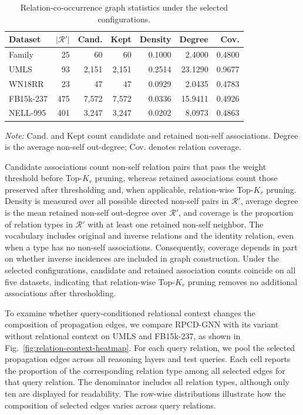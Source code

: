 \documentclass[a4paper,fleqn]{cas-dc}
\newcommand{\papertablestyle}{%
  \footnotesize
  \renewcommand{\arraystretch}{1.12}%
  \setlength{\tabcolsep}{3pt}%
}
\begin{document}
\begin{table}[width=\columnwidth,pos=htbp]
\caption{Relation-co-occurrence graph statistics under the selected configurations.}
\label{tab:relation-context-statistics}
\centering
\papertablestyle
\setlength{\tabcolsep}{1.5pt}
\begin{tabular*}{\linewidth}{@{}l@{\extracolsep{\fill}}rrrrrr@{}}
\toprule
Dataset & $|\mathcal{R}'|$ & Cand. & Kept & Density & Degree & Cov. \\
\midrule
Family & 25 & 60 & 60 & 0.1000 & 2.4000 & 0.4800 \\
UMLS & 93 & 2,151 & 2,151 & 0.2514 & 23.1290 & 0.9677 \\
WN18RR & 23 & 47 & 47 & 0.0929 & 2.0435 & 0.4783 \\
FB15k-237 & 475 & 7,572 & 7,572 & 0.0336 & 15.9411 & 0.4926 \\
NELL-995 & 401 & 3,247 & 3,247 & 0.0202 & 8.0973 & 0.4863 \\
\bottomrule
\end{tabular*}
\par\smallskip
\parbox{\linewidth}{\footnotesize\emph{Note:} Cand. and Kept count candidate and retained non-self associations. Degree is the average non-self out-degree; Cov. denotes relation coverage.}
\end{table}

Candidate associations count non-self relation pairs that pass the weight threshold before Top-$K_r$ pruning, whereas retained associations count those preserved after thresholding and, when applicable, relation-wise Top-$K_r$ pruning. Density is measured over all possible directed non-self pairs in $\mathcal{R}'$, average degree is the mean retained non-self out-degree over $\mathcal{R}'$, and coverage is the proportion of relation types in $\mathcal{R}'$ with at least one retained non-self neighbor. The vocabulary includes original and inverse relations and the identity relation, even when a type has no non-self associations. Consequently, coverage depends in part on whether inverse incidences are included in graph construction. Under the selected configurations, candidate and retained association counts coincide on all five datasets, indicating that relation-wise Top-$K_r$ pruning removes no additional associations after thresholding.

To examine whether query-conditioned relational context changes the composition of propagation edges, we compare RPCD-GNN with its variant without relational context on UMLS and FB15k-237, as shown in Fig.~\ref{fig:relation-context-heatmap}. For each query relation, we pool the selected propagation edges across all reasoning layers and test queries. Each cell reports the proportion of the corresponding relation type among all selected edges for that query relation. The denominator includes all relation types, although only ten are displayed for readability. The row-wise distributions illustrate how the composition of selected edges varies across query relations.
\end{document}

